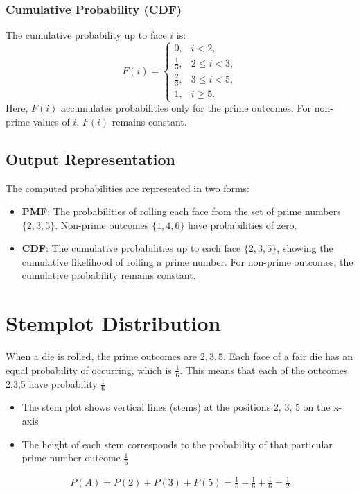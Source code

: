 \documentclass[journal]{IEEEtran}
\begin{document}
\subsubsection*{Cumulative Probability (CDF)}
The cumulative probability up to face \( i \) is:
\[
F(i) = 
\begin{cases} 
0, & i < 2, \\
\frac{1}{3}, & 2 \leq i < 3, \\
\frac{2}{3}, & 3 \leq i < 5, \\
1, & i \geq 5.
\end{cases}
\]
Here, \( F(i) \) accumulates probabilities only for the prime outcomes. For non-prime values of \( i \), \( F(i) \) remains constant.

\subsection*{Output Representation}
The computed probabilities are represented in two forms:
\begin{itemize}
    \item \textbf{PMF}: The probabilities of rolling each face from the set of prime numbers \( \{2, 3, 5\} \). Non-prime outcomes \( \{1, 4, 6\} \) have probabilities of zero.
    \item \textbf{CDF}: The cumulative probabilities up to each face \( \{2, 3, 5\} \), showing the cumulative likelihood of rolling a prime number. For non-prime outcomes, the cumulative probability remains constant.
\end{itemize}

\section*{Stemplot Distribution}
When a die is rolled, the prime outcomes are ${2,3,5}$. Each face of a fair die has an equal probability of occurring, which is $\frac{1}{6}$. This means that each of the outcomes {2,3,5} have probability $\frac{1}{6}$
\begin{itemize}
    \item The stem plot shows vertical lines (stems) at the positions 2, 3, 5 on the x-axis 
    \item The height of each stem corresponds to the probability of that particular prime number outcome $\frac{1}{6}$
\end{itemize}
\begin{align}
    P(A) = P(2) + P(3) + P(5) = \frac{1}{6}+\frac{1}{6} +\frac{1}{6} = \frac{1}{2}
\end{align}
\end{document}
